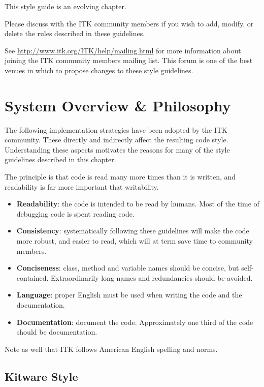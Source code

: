 This style guide is an evolving chapter.

Please discuss with the ITK community members if you wish to add, modify, or
delete the rules described in these guidelines.

See \href{http://www.itk.org/ITK/help/mailing.html}{http://www.itk.org/ITK/help/mailing.html}
for more information about joining the ITK community members mailing list. This
forum is one of the best venues in which to propose changes to these style
guidelines.


\section{System Overview \& Philosophy}
\label{sec:SystemOverviewPhilosophy}

The following implementation strategies have been adopted by the ITK community.
These directly and indirectly affect the resulting code style. Understanding
these aspects motivates the reasons for many of the style guidelines described
in this chapter.

The principle is that code is read many more times than it is written, and
readability is far more important that writability.

\begin{itemize}
\item \textbf{Readability}: the code is intended to be read by humans. Most of
the time of debugging code is spent reading code.
\item \textbf{Consistency}: systematically following these guidelines will make
the code more robust, and easier to read, which will at term save time to
community members.
\item \textbf{Conciseness}: class, method and variable names should be concise,
but self-contained. Extraordinarily long names and redundancies should be
avoided.
\item \textbf{Language}: proper English must be used when writing the code and
the documentation.
\item \textbf{Documentation}: document the code. Approximately one third of the
code should be documentation.
\end{itemize}

Note as well that ITK follows American English spelling and norms.


\subsection{Kitware Style}
\label{subsec:KWStyle}

